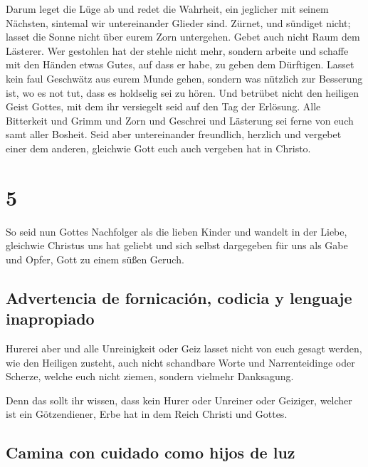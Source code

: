  Darum leget die Lüge ab und redet die Wahrheit, ein
jeglicher mit seinem Nächsten, sintemal wir untereinander Glieder sind.
 Zürnet, und sündiget nicht; lasset die Sonne nicht über
eurem Zorn untergehen.  Gebet auch nicht Raum dem
Lästerer.  Wer gestohlen hat der stehle nicht mehr,
sondern arbeite und schaffe mit den Händen etwas Gutes, auf dass er
habe, zu geben dem Dürftigen.  Lasset kein faul Geschwätz
aus eurem Munde gehen, sondern was nützlich zur Besserung ist, wo es not
tut, dass es holdselig sei zu hören.  Und betrübet nicht
den heiligen Geist Gottes, mit dem ihr versiegelt seid auf den Tag der
Erlösung.  Alle Bitterkeit und Grimm und Zorn und
Geschrei und Lästerung sei ferne von euch samt aller Bosheit.
 Seid aber untereinander freundlich, herzlich und
vergebet einer dem anderen, gleichwie Gott euch auch vergeben hat in
Christo.

\hypertarget{section-4}{%
\section{5}\label{section-4}}

 So seid nun Gottes Nachfolger als die lieben Kinder
 und wandelt in der Liebe, gleichwie Christus uns hat
geliebt und sich selbst dargegeben für uns als Gabe und Opfer, Gott zu
einem süßen Geruch.

\hypertarget{advertencia-de-fornicaciuxf3n-codicia-y-lenguaje-inapropiado}{%
\subsection{Advertencia de fornicación, codicia y lenguaje
inapropiado}\label{advertencia-de-fornicaciuxf3n-codicia-y-lenguaje-inapropiado}}

 Hurerei aber und alle Unreinigkeit oder Geiz lasset nicht
von euch gesagt werden, wie den Heiligen zusteht,  auch
nicht schandbare Worte und Narrenteidinge oder Scherze, welche euch
nicht ziemen, sondern vielmehr Danksagung.

 Denn das sollt ihr wissen, dass kein Hurer oder Unreiner
oder Geiziger, welcher ist ein Götzendiener, Erbe hat in dem Reich
Christi und Gottes.

\hypertarget{camina-con-cuidado-como-hijos-de-luz}{%
\subsection{Camina con cuidado como hijos de
luz}\label{camina-con-cuidado-como-hijos-de-luz}}

